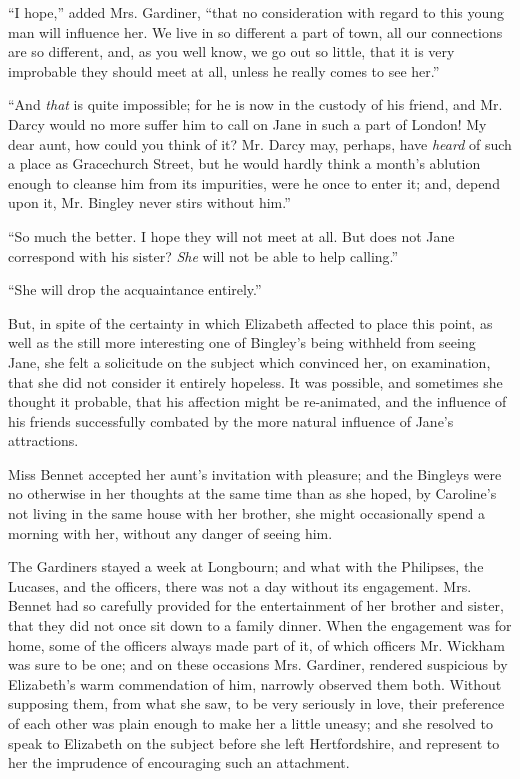 \documentclass[12pt,openright]{book}
\begin{document}
“I hope,” added Mrs. Gardiner, “that no consideration with regard to this young man will influence her. We live in so different a part of town, all our connections are so different, and, as you well know, we go out so little, that it is very improbable they should meet at all, unless he really comes to see her.”

“And \textit{that} is quite impossible; for he is now in the custody of his friend, and Mr. Darcy would no more suffer him to call on Jane in such a part of London! My dear aunt, how could you think of it? Mr. Darcy may, perhaps, have \textit{heard} of such a place as Gracechurch Street, but he would hardly think a month’s ablution enough to cleanse him from its impurities, were he once to enter it; and, depend upon it, Mr. Bingley never stirs without him.”

“So much the better. I hope they will not meet at all. But does not Jane correspond with his sister? \textit{She} will not be able to help calling.”

“She will drop the acquaintance entirely.”

But, in spite of the certainty in which Elizabeth affected to place this point, as well as the still more interesting one of Bingley’s being withheld from seeing Jane, she felt a solicitude on the subject which convinced her, on examination, that she did not consider it entirely hopeless. It was possible, and sometimes she thought it probable, that his affection might be re-animated, and the influence of his friends successfully combated by the more natural influence of Jane’s attractions.

Miss Bennet accepted her aunt’s invitation with pleasure; and the Bingleys were no otherwise in her thoughts at the same time than as she hoped, by Caroline’s not living in the same house with her brother, she might occasionally spend a morning with her, without any danger of seeing him.

The Gardiners stayed a week at Longbourn; and what with the Philipses, the Lucases, and the officers, there was not a day without its engagement. Mrs. Bennet had so carefully provided for the entertainment of her brother and sister, that they did not once sit down to a family dinner. When the engagement was for home, some of the officers always made part of it, of which officers Mr. Wickham was sure to be one; and on these occasions Mrs. Gardiner, rendered suspicious by Elizabeth’s warm commendation of him, narrowly observed them both. Without supposing them, from what she saw, to be very seriously in love, their preference of each other was plain enough to make her a little uneasy; and she resolved to speak to Elizabeth on the subject before she left Hertfordshire, and represent to her the imprudence of encouraging such an attachment.
\end{document}
